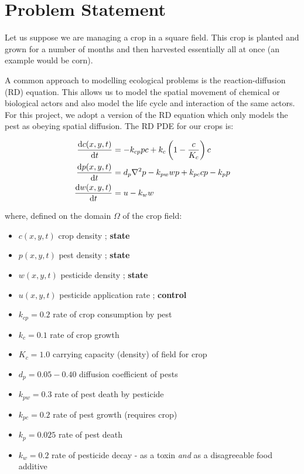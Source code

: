 \documentclass[11pt]{article}
\begin{document}
\section{Problem Statement}
Let us suppose we are managing a crop in a square field. This crop is planted and grown for a number of months and then harvested essentially all at once (an example would be corn).

A common approach to modelling ecological problems is the reaction-diffusion (RD) equation. This allows us to model the spatial movement of chemical or biological actors and also model the life cycle and interaction of the same actors. For this project, we adopt a version of the RD equation which only models the pest as obeying spatial diffusion. The RD PDE for our crops is:

\begin{align}
	\label{eqn:pde}
	\dv{c(x,y,t)}{t} &= -k_{cp} p c + k_c \left( 1 - \frac{c}{K_c} \right) c \nonumber \\ 
	\dv{p(x,y,t)}{t} &= d_p \laplacian{p} - k_{pw} w p + k_{pc} c p - k_p p \\
	\dv{w(x,y,t)}{t} &= u - k_w w \nonumber
\end{align}

where, defined on the domain $\Omega$ of the crop field:

\begin{itemize}
\setlength\itemsep{-1pt}
\item $c(x,y,t)$ crop density ; \textbf{state}
\item $p(x,y,t)$ pest density ; \textbf{state}
\item $w(x,y,t)$ pesticide density ; \textbf{state}
\item $u(x,y,t)$ pesticide application rate ; \textbf{control}
\item $k_{cp} = 0.2$ rate of crop consumption by pest
\item $k_c = 0.1$ rate of crop growth
\item $K_c = 1.0$ carrying capacity (density) of field for crop
\item $d_p = 0.05 - 0.40$ diffusion coefficient of pests
\item $k_{pw} = 0.3$ rate of pest death by pesticide
\item $k_{pc} = 0.2$ rate of pest growth (requires crop)
\item $k_p = 0.025$ rate of pest death
\item $k_w = 0.2$ rate of pesticide decay - as a toxin \textit{and} as a disagreeable food additive \cite{R4}
\end{itemize}
\end{document}
